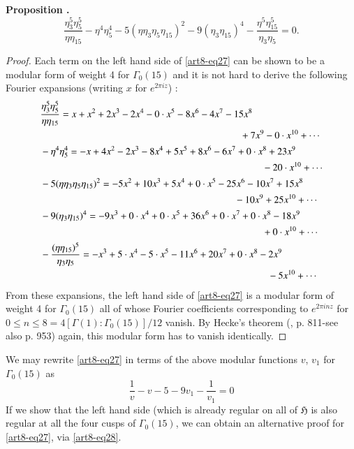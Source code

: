 \medskip
\noindent
{\bf Proposition .\label{art8-prop2}}~\pageoriginale
\begin{equation}
\frac{\eta^{5}_{3}\eta^{5}_{5}}{\eta\eta_{15}}-\eta^{4}\eta^{4}_{5}-5(\eta\eta_{3}\eta_{5}\eta_{15})^{2}-9(\eta_{3}\eta_{15})^{4}-\dfrac{\eta^{5}\eta^{5}_{15}}{\eta_{3}\eta_{5}}=0.\label{art8-eq27}
\end{equation}

\begin{proof}
Each term on the left hand side of \eqref{art8-eq27} can be shown to be a modular form of weight 4 for $\Gamma_{0}(15)$ and it is not hard to derive the following Fourier expansions (writing $x$ for $e^{2\pi iz}$) :
\begin{align*}
& \frac{\eta^{5}_{3}\eta^{5}_{5}}{\eta\eta_{15}}=x+x^{2}+2x^{3}-2x^{4}-0\cdot x^{5}-8x^{6}-4x^{7}-15x^{8}\\
&\hspace{7.2cm} +7x^{9}-0\cdot x^{10}+\cdots\\
& -\eta^{4}\eta^{4}_{5}=-x+4x^{2}-2x^{3}-8x^{4}+5x^{5}+8x^{6}-6x^{7}+0\cdot x^{8}+23x^{9}\\
&\hspace{8cm} -20\cdot x^{10}+\cdots\\
& -5(\eta\eta_{3}\eta_{5}\eta_{15})^{2}=-5x^{2}+10x^{3}+5x^{4}+0\cdot x^{5}-25x^{6}-10x^{7}+15x^{8}\\
&\hspace{7cm} -10x^{9}+25x^{10}+\cdots\\
& -9(\eta_{3}\eta_{15})^{4}=-9x^{3}+0\cdot x^{4}+0\cdot x^{5}+36x^{6}+0\cdot x^{7}+0\cdot x^{8}-18x^{9}\\
&\hspace{8cm} +0\cdot x^{10}+\cdots\\
& -\frac{(\eta\eta_{15})^{5}}{\eta_{3}\eta_{5}}=-x^{3}+5\cdot x^{4}-5\cdot x^{5}-11x^{6}+20x^{7}+0\cdot x^{8}-2x^{9}\\
&\hspace{8.2cm}-5x^{10}+\cdots
\end{align*}
From these expansions, the left hand side of \eqref{art8-eq27} is a modular form of weight 4 for $\Gamma_{0}(15)$ all of whose Fourier coefficients corresponding to $e^{2\pi inz}$ for $0\leq n\leq 8=4[\Gamma(1) : \Gamma_{0}(15)]/12$ vanish. By Hecke's theorem (\cite{art8-key5}, p. 811-see also p. 953) again, this modular form has to vanish identically.
\end{proof}

\begin{remark*}
We may rewrite \eqref{art8-eq27} in terms of the above modular functions $v$, $v_{1}$ for $\Gamma_{0}(15)$ as 
\begin{equation}
\frac{1}{v}-v-5-9v_{1}-\frac{1}{v_{1}}=0\label{art8-eq28}
\end{equation}
If we show that the left hand side (which is already regular on all of $\mathfrak{H}$ is also regular at all the four cusps of $\Gamma_{0}(15)$, we can obtain an alternative proof for \eqref{art8-eq27}, via \eqref{art8-eq28}.
\end{remark*}

